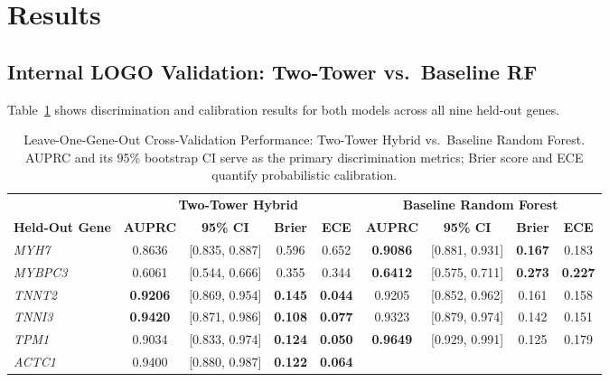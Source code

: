 \documentclass[conference]{IEEEtran}
\begin{document}
\section{Results}
\label{sec:results}

\subsection{Internal LOGO Validation: Two-Tower vs.\ Baseline RF}

Table~\ref{tab:logo} shows discrimination and calibration results for both models across all nine held-out genes.

\begin{table}[t]
\centering
\caption{Leave-One-Gene-Out Cross-Validation Performance: Two-Tower Hybrid vs.\ Baseline Random Forest. AUPRC and its 95\% bootstrap CI serve as the primary discrimination metrics; Brier score and ECE quantify probabilistic calibration.}
\label{tab:logo}
\setlength{\tabcolsep}{4.5pt}
\begin{tabular}{l cc cc cc cc}
\toprule
& \multicolumn{4}{c}{\textbf{Two-Tower Hybrid}} &
  \multicolumn{4}{c}{\textbf{Baseline Random Forest}} \\
\cmidrule(lr){2-5}\cmidrule(lr){6-9}
\textbf{Held-Out Gene} &
  \textbf{AUPRC} & \textbf{95\% CI} & \textbf{Brier} & \textbf{ECE} &
  \textbf{AUPRC} & \textbf{95\% CI} & \textbf{Brier} & \textbf{ECE} \\
\midrule
\textit{MYH7}   & 0.8636 & [0.835, 0.887] & 0.596 & 0.652 &
                  \textbf{0.9086} & [0.881, 0.931] & \textbf{0.167} & 0.183 \\
\textit{MYBPC3} & 0.6061 & [0.544, 0.666] & 0.355 & 0.344 &
                  \textbf{0.6412} & [0.575, 0.711] & \textbf{0.273} & \textbf{0.227} \\
\textit{TNNT2}  & \textbf{0.9206} & [0.869, 0.954] & \textbf{0.145} & \textbf{0.044} &
                  0.9205 & [0.852, 0.962] & 0.161 & 0.158 \\
\textit{TNNI3}  & \textbf{0.9420} & [0.871, 0.986] & \textbf{0.108} & \textbf{0.077} &
                  0.9323 & [0.879, 0.974] & 0.142 & 0.151 \\
\textit{TPM1}   & 0.9034 & [0.833, 0.974] & \textbf{0.124} & \textbf{0.050} &
                  \textbf{0.9649} & [0.929, 0.991] & 0.125 & 0.179 \\
\textit{ACTC1}  & 0.9400 & [0.880, 0.987] & \textbf{0.122} & \textbf{0.064} &

\end{tabular}
\end{table}
\end{document}
